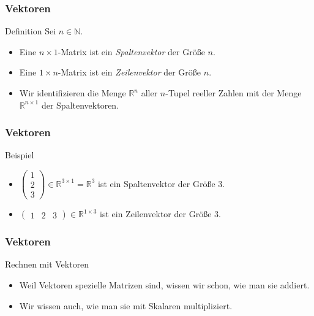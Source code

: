 \documentclass{beamer}
\title[Linadi]{\mytitle}
\author[Amin Coja-Oghlan]{Amin Coja-Oghlan}
\institute[Frankfurt]{JWGUFFM}
\date{}
\renewcommand{\emph}[1]{{\textcolor{solarizedRed}{\itshape #1}}}
\newcommand\NN{\mathbb N}
\newcommand\RR{\mathbb R}
\renewcommand{\oe}{\"o}
\newcommand{\mytitle}{Vektoren}
\begin{document}
\frame[plain]{\titlepage}

\begin{frame}\frametitle{\mytitle}
	\begin{block}{Definition}
		Sei $n\in\NN$.
	\begin{itemize}
		\item Eine $n\times 1$-Matrix ist ein \emph{Spaltenvektor} der Gr\oe\ss e $n$.
		\item Eine $1\times n$-Matrix ist ein \emph{Zeilenvektor} der Gr\oe\ss e $n$.
		\item Wir identifizieren die Menge $\RR^n$ aller $n$-Tupel reeller Zahlen mit der Menge $\RR^{n\times 1}$ der Spaltenvektoren.
	\end{itemize}
	\end{block}
\end{frame}

\begin{frame}\frametitle{\mytitle}
	\begin{block}{Beispiel}
	\begin{itemize}
		\item $\begin{pmatrix}1\\2\\3\end{pmatrix}\in\RR^{3\times 1}=\RR^3$ ist ein Spaltenvektor der Gr\oe\ss e 3.
		\item $\begin{pmatrix}1&2&3\end{pmatrix}\in\RR^{1\times 3}$ ist ein Zeilenvektor der Gr\oe\ss e 3.
	\end{itemize}
	\end{block}
\end{frame}

\begin{frame}\frametitle{\mytitle}
	\begin{block}{Rechnen mit Vektoren}
	\begin{itemize}
		\item Weil Vektoren spezielle Matrizen sind, wissen wir schon, wie man sie addiert.
		\item Wir wissen auch, wie man sie mit Skalaren multipliziert.
	\end{itemize}
	\end{block}
\end{frame}
\end{document}
